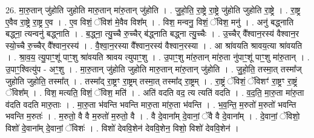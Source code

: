 \documentclass[17pt]{extarticle}
\begin{document}
26. मा॒रु॒तान् जु॑होति जुहोति मारु॒तान् मा॑रु॒तान् जु॑होति । . जु॒हो॒ति॒ रा॒ष्ट्रे रा॒ष्ट्रे जु॑होति जुहोति रा॒ष्ट्रे । . रा॒ष्ट्र ए॒वैव रा॒ष्ट्रे रा॒ष्ट्र ए॒व । . ए॒व विशं॒ ॅविश॑ मे॒वैव विश᳚म् । . विश॒ मन्वनु॒ विशं॒ ॅविश॒ मनु॑ । . अनु॑ बद्ध्नाति बद्ध्ना॒ त्यन्वनु॑ बद्ध्नाति । . ब॒द्ध्ना॒ त्यु॒च्चै रु॒च्चैर् ब॑द्ध्नाति बद्ध्ना त्यु॒च्चैः । . उ॒च्चैर् वै᳚श्वान॒रस्य॑ वैश्वान॒र स्यो॒च्चै रु॒च्चैर् वै᳚श्वान॒रस्य॑ । . वै॒श्वा॒न॒रस्या वै᳚श्वान॒रस्य॑ वैश्वान॒रस्या । . आ श्रा॑वयति श्रावय॒त्या श्रा॑वयति । . श्रा॒व॒य॒ त्यु॒पाꣳ॒॒शू॑ पाꣳ॒॒शु श्रा॑वयति श्रावय त्युपाꣳ॒॒शु । . उ॒पाꣳ॒॒शु मा॑रु॒तान् मा॑रु॒ता नु॑पाꣳ॒॒शू॑ पाꣳ॒॒शु मा॑रु॒तान् । . उ॒पाꣳ॒॒श्वित्यु॑प - अꣳ॒॒शु । . मा॒रु॒तान् जु॑होति जुहोति मारु॒तान् मा॑रु॒तान् जु॑होति । . जु॒हो॒ति॒ तस्मा॒त् तस्मा᳚ज् जुहोति जुहोति॒ तस्मा᳚त् । . तस्मा᳚द् रा॒ष्ट्रꣳ रा॒ष्ट्रम् तस्मा॒त् तस्मा᳚द् रा॒ष्ट्रम् । . रा॒ष्ट्रं ॅविशं॒ ॅविशꣳ॑ रा॒ष्ट्रꣳ रा॒ष्ट्रं ॅविश᳚म् । . विश॒ मत्यति॒ विशं॒ ॅविश॒ मति॑ । . अति॑ वदति वद॒ त्य त्यति॑ वदति । . व॒द॒ति॒ मा॒रु॒ता मा॑रु॒ता व॑दति वदति मारु॒ताः । . मा॒रु॒ता भ॑वन्ति भवन्ति मारु॒ता मा॑रु॒ता भ॑वन्ति । . भ॒व॒न्ति॒ म॒रुतो॑ म॒रुतो॑ भवन्ति भवन्ति म॒रुतः॑ । . म॒रुतो॒ वै वै म॒रुतो॑ म॒रुतो॒ वै । . वै दे॒वाना᳚म् दे॒वानां॒ ॅवै वै दे॒वाना᳚म् । . दे॒वानां॒ ॅविशो॒ विशो॑ दे॒वाना᳚म् दे॒वानां॒ ॅविशः॑ । . विशो॑ देववि॒शेन॑ देववि॒शेन॒ विशो॒ विशो॑ देववि॒शेन॑ । \newline
\end{document}
